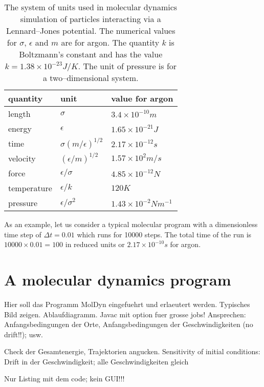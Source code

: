 \begin{table}[htbp]
  \begin{center}
    \begin{tabular}{lll} \hline \hline
    quantity    & unit                 & value for argon \\ \hline
    length      & $\sigma$             &    $3.4 \times 10^{-10} m$ \\
    energy      &   $\epsilon$         & $1.65\times 10^{-21} J$ \\
    time        & $\sigma (m/\epsilon)^{1/2}$ & $2.17 \times 10^{-12}s$ \\
    velocity    & $(\epsilon/m)^{1/2}$ & $1.57 \times 10^2 m/s$ \\
    force       & $\epsilon/\sigma$    & $4.85 \times 10^{-12} N$ \\
    temperature & $\epsilon/k$         & $120 K$ \\
    pressure    & $\epsilon/\sigma^2$  & $1.43 \times 10^{-2}Nm^{-1}$ \\
    \hline \hline  
      \end{tabular}
    \caption{The system of units used in molecular dynamics simulation of
    particles interacting via a Lennard--Jones potential. The numerical values
    for $\sigma$, $\epsilon$ and $m$ are for argon. The quantity $k$ is
    Boltzmann's constant and has the value $k=1.38 \times 10^{-23} J/K$. The
    unit of pressure is for a two--dimensional system.}
    \label{tab:SystemUnitsMD}
  \end{center}
\end{table}
As an example, let us consider a typical molecular program  with a
dimensionless time
step of $\Delta t= 0.01$ which runs for 10000 steps. The total time of the run
is $10000 \times 0.01 = 100$ in reduced units or $2.17 \times 10^{-10}s$ for
argon. 

\section{A molecular dynamics program}
Hier soll das Programm MolDyn eingefuehrt und erlaeutert werden.
Typisches Bild zeigen. Ablaufdiagramm. Javac mit option fuer grosse jobs!
Ansprechen: Anfangsbedingungen der Orte, Anfangsbedingungen der
Geschwindigkeiten (no drift!!); usw.

Check der Gesamtenergie, Trajektorien angucken. Sensitivity of initial
conditions: Drift in der Geschwindigkeit; alle Geschwindigkeiten gleich

Nur Listing mit dem code; kein GUI!!! 

